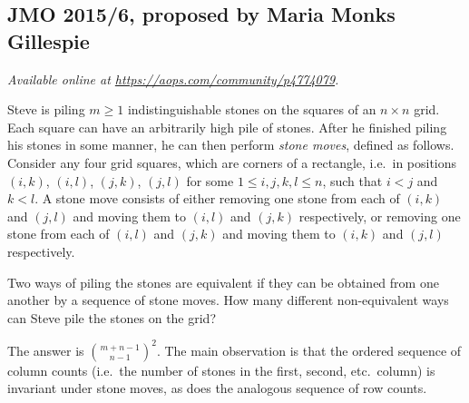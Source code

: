 \documentclass[11pt]{scrartcl}
\begin{document}
\subsection{JMO 2015/6, proposed by Maria Monks Gillespie}
\textsl{Available online at \url{https://aops.com/community/p4774079}.}
\begin{mdframed}[style=mdpurplebox,frametitle={Problem statement}]
Steve is piling $m\geq 1$ indistinguishable stones
on the squares of an $n\times n$ grid.
Each square can have an arbitrarily high pile of stones.
After he finished piling his stones in some manner,
he can then perform \emph{stone moves}, defined as follows.
Consider any four grid squares, which are corners of a rectangle,
i.e.\ in positions $(i, k)$, $(i, l)$, $(j, k)$, $(j, l)$
for some $1\leq i, j, k, l\leq n$, such that $i<j$ and $k<l$.
A stone move consists of either removing one stone from each of
$(i, k)$ and $(j, l)$ and moving them to $(i, l)$ and $(j, k)$ respectively,
or removing one stone from each of $(i, l)$ and $(j, k)$
and moving them to $(i, k)$ and $(j, l)$ respectively.

Two ways of piling the stones are equivalent if they can be obtained
from one another by a sequence of stone moves.
How many different non-equivalent ways can Steve pile the stones on the grid?
\end{mdframed}
The answer is $\binom{m+n-1}{n-1}^2$.
The main observation is that the ordered sequence of column counts
(i.e.\ the number of stones in the first, second, etc.\ column)
is invariant under stone moves, as does the analogous sequence of row counts.
\end{document}
